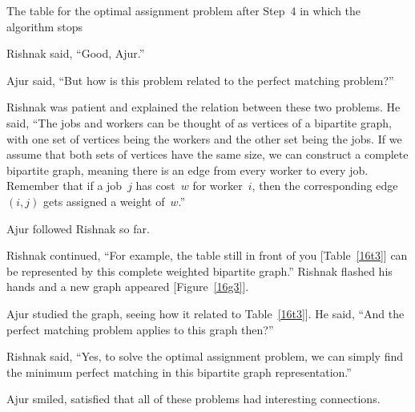 \begin{table}
\begin{center}

\caption{The table for the optimal assignment problem after Step~4 in which the algorithm stops}\label{16t9}
\end{center}
\end{table}

Rishnak said, ``Good, Ajur.''

Ajur said, ``But how is this problem related to the perfect matching problem?''

Rishnak was patient and explained the relation between these two problems. He said, ``The jobs and workers can be thought of as vertices of a bipartite graph, with one set of vertices being the workers and the other set being the jobs. If we assume that both sets of vertices have the same size, we can
construct a complete bipartite graph, meaning there is an edge from every worker to every job. Remember that if a job~$j$ has cost~$w$ for worker~$i$, then the corresponding edge~$(i,j)$ gets assigned a weight of~$w$.''

Ajur followed Rishnak so far.

Rishnak continued, ``For example, the table still in front of you [Table~\ref{16t3}] can be represented by this complete weighted bipartite graph.'' Rishnak flashed his hands and a new graph appeared [Figure~\ref{16g3}].

Ajur studied the graph, seeing how it related to Table~\ref{16t3}]. He said, ``And the perfect matching problem applies to this graph then?''

Rishnak said, ``Yes, to solve the optimal assignment problem, we can simply find the minimum perfect matching in this bipartite graph representation.''

Ajur smiled, satisfied that all of these problems had interesting connections.

